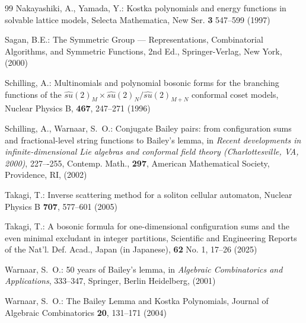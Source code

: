 \documentclass[sn-mathphys-num]{sn-jnl}%
\theoremstyle{thmstyleone}%
\theoremstyle{thmstyletwo}%
\theoremstyle{thmstylethree}%
\begin{document}
\begin{thebibliography}{99}
Nakayashiki, A., Yamada, Y.:
{Kostka polynomials and energy functions in solvable lattice models},
Selecta Mathematica, New Ser. {\bf 3} 547--599 (1997)

Sagan, B.E.:
{The Symmetric Group --- Representations, Combinatorial Algorithms, and Symmetric Functions},
2nd Ed., Springer-Verlag, New York, (2000)

Schilling, A.:
{Multinomials and polynomial bosonic forms for the branching functions of the $\widehat{su}(2)_M \times \widehat{su}(2)_N/\widehat{su}(2)_{M+N}$ conformal coset models},
Nuclear Physics B, {\bf 467}, 247--271 (1996)

Schilling, A.,  Warnaar, S.~O.:
{Conjugate Bailey pairs: from configuration sums and fractional-level string functions to Bailey's lemma},
in \textit{Recent developments in infinite-dimensional Lie algebras and conformal field theory (Charlottesville, VA, 2000)}, 227–-255,
Contemp. Math., {\bf 297},
American Mathematical Society, Providence, RI, (2002)


Takagi, T.:
{Inverse scattering method for a soliton cellular automaton},
{Nuclear Physics B} {\bf 707}, 577--601 (2005)

Takagi, T.:
{A bosonic formula for one-dimensional configuration sums and the even minimal excludant in integer partitions},
{Scientific and Engineering Reports of the Nat'l. Def. Acad., Japan} (in Japanese), 
{\bf 62} No. 1, 17--26 (2025)

Warnaar, S.~O.:
{50 years of Bailey's lemma},
in {\em Algebraic Combinatorics and Applications}, 333--347,
Springer, Berlin Heidelberg, (2001)

Warnaar, S.~O.:
{The Bailey Lemma and Kostka Polynomials},
Journal of Algebraic Combinatorics {\bf 20}, 131--171 (2004)

\end{thebibliography}
\end{document}
